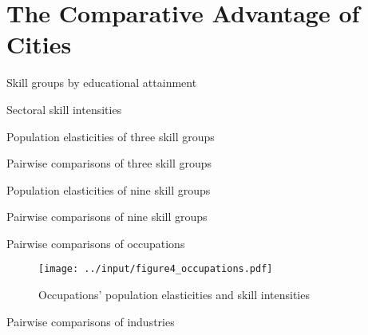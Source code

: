 \documentclass[11pt]{article}
\begin{document}
\section{The Comparative Advantage of Cities}

\begin{table} \caption{Skill groups by educational attainment}
\resizebox{\textwidth}{!}{}
\label{tab:shares}
\end{table}

\begin{table} \caption{Sectoral skill intensities}
\resizebox{\textwidth}{!}{}
\label{tab:skillintensities}
\end{table}

\begin{table} \caption{Population elasticities of three skill groups}

\label{tab:edu3_popelast}
\end{table}

\begin{table} \caption{Pairwise comparisons of three skill groups}
	\resizebox{\textwidth}{!}{}
\label{tab:edu3_pairwise}
\end{table}

\begin{table} \caption{Population elasticities of nine skill groups}

\label{tab:edu9_popelast}
\end{table}
\begin{table} \caption{Pairwise comparisons of nine skill groups}
	\resizebox{\textwidth}{!}{}
\label{tab:edu9_pairwise}
\end{table}

\begin{table} \caption{Pairwise comparisons of occupations}
	\resizebox{\textwidth}{!}{}
\label{tab:occ_pairwise}
\end{table}

\begin{figure} \caption{Occupations' population elasticities and skill intensities} \begin{center}
\texttt{[image: ../input/figure4\_occupations.pdf]}
\label{fig:occ_popelast}
\end{center}\end{figure}

\begin{table} \caption{Pairwise comparisons of industries}
	\resizebox{\textwidth}{!}{}
\label{tab:ind_pairwise}
\end{table}
\end{document}
